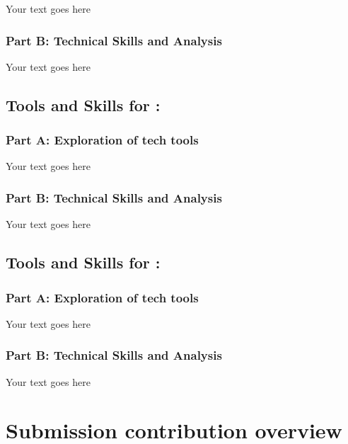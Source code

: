 \documentclass[a4paper, 11pt]{report}
\begin{document}
\begin{enumerate}
Your text goes here

\subsubsection{Part B: Technical Skills and Analysis}

Your text goes here




\subsection{Tools and Skills for \majC: \studC}

\subsubsection{Part A: Exploration of tech tools}

Your text goes here

\subsubsection{Part B: Technical Skills and Analysis}

Your text goes here




\subsection{Tools and Skills for \majD: \studD}

\subsubsection{Part A: Exploration of tech tools}

Your text goes here

\subsubsection{Part B: Technical Skills and Analysis}

Your text goes here


\newpage
\section{Submission contribution overview}


\end{enumerate}
\end{document}
